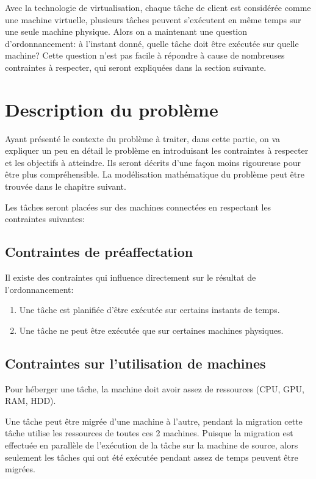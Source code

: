 Avec la technologie de virtualisation, chaque tâche de client est considérée comme une machine virtuelle, plusieurs tâches peuvent s'exécutent en même temps sur une seule machine physique. Alors on a maintenant une question d'ordonnancement: à l'instant donné, quelle tâche doit être exécutée sur quelle machine? Cette question n'est pas facile à répondre à cause de nombreuses contraintes à respecter, qui seront expliquées dans la section suivante.


\section{Description du problème}
Ayant présenté le contexte du problème à traiter, dans cette partie, on va expliquer un peu en détail le problème en introduisant les contraintes à respecter et les objectifs à atteindre. Ils seront décrits d'une façon moins rigoureuse pour être plus compréhensible. La modélisation mathématique du problème peut être trouvée dans le chapitre suivant.


Les tâches seront placées sur des machines connectées en respectant les contraintes suivantes:


\subsection{Contraintes de préaffectation}
Il existe des contraintes qui influence directement sur le résultat de l'ordonnancement:
\bigskip
\begin{enumerate}
	\item Une tâche est planifiée d'être exécutée sur certains instants de temps.
	\item Une tâche ne peut être exécutée que sur certaines machines physiques.
\end{enumerate}
\bigskip

\subsection{Contraintes sur l'utilisation de machines}
Pour héberger une tâche, la machine doit avoir assez de ressources (CPU, GPU, RAM, HDD).


Une tâche peut être migrée d'une machine à l'autre, pendant la migration cette tâche utilise les ressources de toutes ces 2 machines. Puisque la migration est effectuée en parallèle de l'exécution de la tâche sur la machine de source, alors seulement les tâches qui ont été exécutée pendant assez de temps peuvent être migrées.


